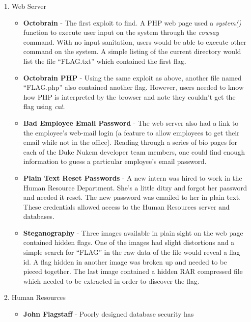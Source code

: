 \documentclass[10pt]{article}
\begin{document}
\begin{enumerate}
  \item Web Server
      \begin{itemize}
        \item \textbf{Octobrain} - The first exploit to find. A PHP web page
        used a \textit{system()} function to execute user input on the system
        through the \textit{cowsay} command. With no input sanitation, users
        would be able to execute other command on the system. A simple listing
        of the current directory would list the file ``FLAG.txt'' which
        contained the first flag.
        \item \textbf{Octobrain PHP} - Using the same exploit as above, another
        file named ``FLAG.php'' also contained another flag. However, users
        needed to know how PHP is interpreted by the browser and note they
        couldn't get the flag using \textit{cat}.
        \item \textbf{Bad Employee Email Password} - The web server also had a
        link to the employee's web-mail login (a feature to allow employees to
        get their email while not in the office). Reading through a series of
        bio pages for each of the Duke Nukem developer team members, one could
        find enough information to guess a particular employee's email password.
        \item \textbf{Plain Text Reset Passwords} - A new intern was hired to
        work in the Human Resource Department. She's a little ditzy and forgot
        her password and needed it reset. The new password was emailed to her in
        plain text. These credentials allowed access to the Human Resources
        server and databases.
        \item \textbf{Steganography} - Three images available in plain sight on
        the web page contained hidden flags. One of the images had slight
        distortions and a simple search for ``FLAG'' in the raw data of the
        file would reveal a flag id. A flag hidden in another image was
        broken up and needed to be pieced together. The last image contained a
        hidden RAR compressed file which needed to be extracted in order to
        discover the flag.
      \end{itemize}
  \item Human Resources
      \begin{itemize}
        \item \textbf{John Flagstaff} - Poorly designed database security has

\end{itemize}
\end{enumerate}
\end{document}

